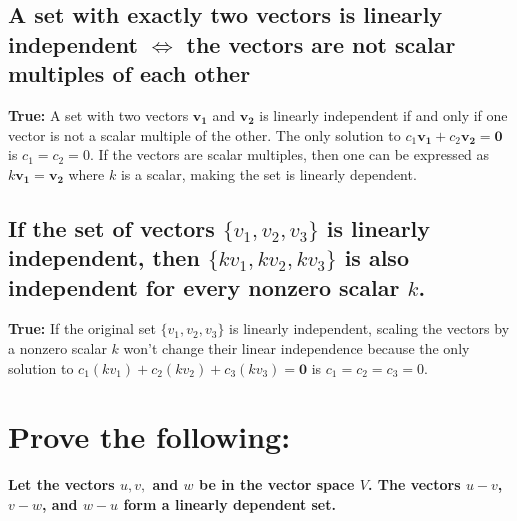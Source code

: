 \documentclass[
  letterpaper,
  DIV=11,
  numbers=noendperiod]{scrartcl}
\begin{document}
\subsection{\texorpdfstring{A set with exactly two vectors is linearly
independent \(\iff\) the vectors are not scalar multiples of each
other}{A set with exactly two vectors is linearly independent \textbackslash iff the vectors are not scalar multiples of each other}}\label{a-set-with-exactly-two-vectors-is-linearly-independent-iff-the-vectors-are-not-scalar-multiples-of-each-other}

\textbf{True:} A set with two vectors \(\mathbf{v_1}\) and
\(\mathbf{v_2}\) is linearly independent if and only if one vector is
not a scalar multiple of the other. The only solution to
\(c_1\mathbf{v_1} + c_2\mathbf{v_2} = \mathbf{0}\) is \(c_1 = c_2 = 0\).
If the vectors are scalar multiples, then one can be expressed as
\(k\mathbf{v_1}=\mathbf{v_2}\) where \(k\) is a scalar, making the set
is linearly dependent.

\subsection{\texorpdfstring{If the set of vectors \(\{v_1, v_2, v_3\}\)
is linearly independent, then \(\{kv_1, kv_2, kv_3\}\) is also
independent for every nonzero scalar
\(k\).}{If the set of vectors \textbackslash\{v\_1, v\_2, v\_3\textbackslash\} is linearly independent, then \textbackslash\{kv\_1, kv\_2, kv\_3\textbackslash\} is also independent for every nonzero scalar k.}}\label{if-the-set-of-vectors-v_1-v_2-v_3-is-linearly-independent-then-kv_1-kv_2-kv_3-is-also-independent-for-every-nonzero-scalar-k.}

\textbf{True:} If the original set \(\{v_1,v_2,v_3\}\) is linearly
independent, scaling the vectors by a nonzero scalar \(k\) won't change
their linear independence because the only solution to
\(c_1(kv_1) + c_2(kv_2) + c_3(kv_3) = \mathbf{0}\) is
\(c_1 = c_2 = c_3 = 0\).

\newpage{}

\section{Prove the following:}\label{prove-the-following}

\textbf{Let the vectors \(u, v,\) and \(w\) be in the vector space
\(V\). The vectors \(u-v\), \(v-w\), and \(w-u\) form a linearly
dependent set.}
\end{document}
